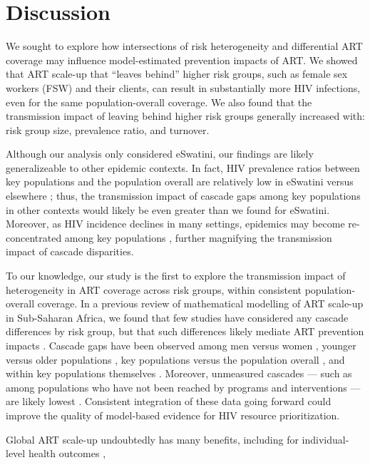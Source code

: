 \section{Discussion}\label{disc}
We sought to explore how intersections of risk heterogeneity and differential ART coverage
may influence model-estimated prevention impacts of ART.
We showed that ART scale-up that ``leaves behind'' higher risk groups,
such as female sex workers (FSW) and their clients,
can result in substantially more HIV infections,
even for the same population-overall coverage.
We also found that the transmission impact of leaving behind higher risk groups
generally increased with: {\color{lightgray}risk group size, prevalence ratio, and turnover.} %
\par
Although our analysis only considered eSwatini,
our findings are likely generalizeable to other epidemic contexts.
In fact, HIV prevalence ratios between key populations and the population overall
are relatively low in eSwatini versus elsewhere \cite{Baral2012,Hessou2019};
thus, the transmission impact of cascade gaps among key populations in other contexts
would likely be even greater than we found for eSwatini.
Moreover, as HIV incidence declines in many settings,
epidemics may become re-concentrated among key populations \cite{Brown2019,Garnett2021},
further magnifying the transmission impact of cascade disparities.
\par
To our knowledge, our study is the first to explore the transmission impact of
heterogeneity in ART coverage across risk groups, within consistent population-overall coverage.
In a previous review of mathematical modelling of ART scale-up in Sub-Saharan Africa,
we found that few studies have considered any cascade differences by risk group,
but that such differences likely mediate ART prevention impacts \cite{Knight2022-sr}.
Cascade gaps have been observed among men versus women \cite{Quinn2019,Green2020},
younger versus older populations \cite{Green2020,Lebelonyane2021},
key populations versus the population overall \cite{Hakim2018},
and within key populations themselves \cite{Mayanja2018,Jaffer2022}.
Moreover, unmeasured cascades
--- such as among populations who have not been reached by programs and interventions ---
are likely lowest \cite{Hakim2018,Boothe2021}.
Consistent integration of these data going forward could
improve the quality of model-based evidence for HIV resource prioritization.
\par
Global ART scale-up undoubtedly has many benefits, including for
individual-level health outcomes \cite{Gabillard2013,Lundgren2015},
